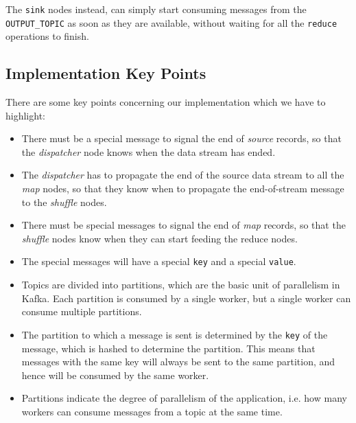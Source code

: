 The \texttt{sink} nodes instead, can simply start consuming messages from the \verb|OUTPUT_TOPIC| as soon as they are available, without waiting for all the \texttt{reduce} operations to finish.

\subsection{Implementation Key Points}

There are some key points concerning our implementation which we have to highlight:
\begin{itemize}
   \item There must be a special message to signal the end of \textit{source} records, so that the \textit{dispatcher} node knows when the data stream has ended.
   \item The \textit{dispatcher} has to propagate the end of the source data stream to all the \textit{map} nodes, so that they know when to propagate the end-of-stream message to the \textit{shuffle} nodes.
   \item There must be special messages to signal the end of \textit{map} records, so that the \textit{shuffle} nodes know when they can start feeding the reduce nodes.
   \item The special messages will have a special \verb|key| and a special \verb|value|.
   \item Topics are divided into partitions, which are the basic unit of parallelism in Kafka. Each partition is consumed by a single worker, but a single worker can consume multiple partitions.
   \item The partition to which a message is sent is determined by the \verb|key| of the message, which is hashed to determine the partition. This means that messages with the same key will always be sent to the same partition, and hence will be consumed by the same worker.
   \item Partitions indicate the degree of parallelism of the application, i.e. how many workers can consume messages from a topic at the same time.
\end{itemize} 

